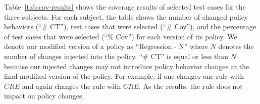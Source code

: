 

%



Table~\ref{tab:cov-results} shows the coverage results of selected test cases for the three subjects.
For each subject, the table shows the number of
changed policy behaviors (``\# CT''), test
cases that were selected (``\# Cov''), and the percentage of test
cases that were selected (``\% Cov'') for each version of its policy.
We denote our modified version of a policy as ``Regression - N'' where
$N$ denotes the number of changes injected into the policy.
``\# CT'' is equal or less than $N$ because our injected changes may not introduce
policy behavior changes at the final modified version of the policy. For example, if one changes
one rule with $CRE$ and again changes the rule with $CRE$. As the results, the rule does not impact
on policy changes.



